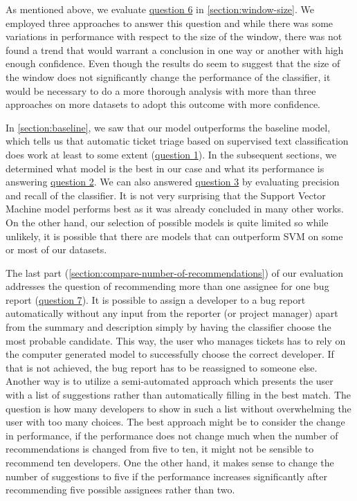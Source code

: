 As mentioned above, we evaluate \hyperlink{question:6}{question 6} in \autoref{section:window-size}. We employed three approaches to answer this question and while there was some variations in performance with respect to the size of the window, there was not found a trend that would warrant a conclusion in one way or another with high enough confidence. Even though the results do seem to suggest that the size of the window does not significantly change the performance of the classifier, it would be necessary to do a more thorough analysis with more than three approaches on more datasets to adopt this outcome with more confidence.

In \autoref{section:baseline}, we saw that our model outperforms the baseline model, which tells us that automatic ticket triage based on supervised text classification does work at least to some extent (\hyperlink{question:1}{question 1}). In the subsequent sections, we determined what model is the best in our case and what its performance is answering \hyperlink{question:2}{question 2}. We can also answered \hyperlink{question:3}{question 3} by evaluating precision and recall of the classifier. It is not very surprising that the Support Vector Machine model performs best as it was already concluded in many other works. On the other hand, our selection of possible models is quite limited so while unlikely, it is possible that there are models that can outperform SVM on some or most of our datasets.

The last part (\autoref{section:compare-number-of-recommendations}) of our evaluation addresses the question of recommending more than one assignee for one bug report (\hyperlink{question:7}{question 7}). It is possible to assign a developer to a bug report automatically without any input from the reporter (or project manager) apart from the summary and description simply by having the classifier choose the most probable candidate. This way, the user who manages tickets has to rely on the computer generated model to successfully choose the correct developer. If that is not achieved, the bug report has to be reassigned to someone else. Another way is to utilize a semi-automated approach which presents the user with a list of suggestions rather than automatically filling in the best match. The question is how many developers to show in such a list without overwhelming the user with too many choices. The best approach might be to consider the change in performance, if the performance does not change much when the number of recommendations is changed from five to ten, it might not be sensible to recommend ten developers. One the other hand, it makes sense to change the number of suggestions to five if the performance increases significantly after recommending five possible assignees rather than two.

